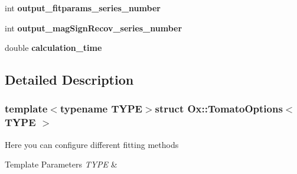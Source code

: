 \begin{DoxyCompactItemize}
\item 
\hypertarget{struct_ox_1_1_tomato_options_a58664e816cde6eff746bd5abe4fe2d1c}{int {\bfseries output\-\_\-fitparams\-\_\-series\-\_\-number}}\label{struct_ox_1_1_tomato_options_a58664e816cde6eff746bd5abe4fe2d1c}

\item 
\hypertarget{struct_ox_1_1_tomato_options_aa400d54038d7cbeb905244a9e7d78c44}{int {\bfseries output\-\_\-mag\-Sign\-Recov\-\_\-series\-\_\-number}}\label{struct_ox_1_1_tomato_options_aa400d54038d7cbeb905244a9e7d78c44}

\item 
\hypertarget{struct_ox_1_1_tomato_options_a008c932c7d65248d2d82e0e654993384}{double {\bfseries calculation\-\_\-time}}\label{struct_ox_1_1_tomato_options_a008c932c7d65248d2d82e0e654993384}

\end{DoxyCompactItemize}


\subsection{Detailed Description}
\subsubsection*{template$<$typename T\-Y\-P\-E$>$struct Ox\-::\-Tomato\-Options$<$ T\-Y\-P\-E $>$}

Here you can configure different fitting methods 
\begin{DoxyTemplParams}{Template Parameters}
{\em T\-Y\-P\-E} & \\
\hline
\end{DoxyTemplParams}


